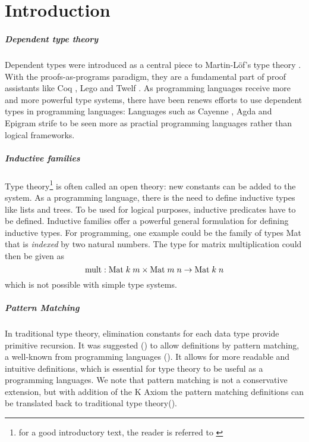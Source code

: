 \chapter{Introduction}

\paragraph*{Dependent type theory}

Dependent types were introduced as a central piece to Martin-L\"of's type theory \cite{mart84}. With the proofs-as-programs paradigm, they are a fundamental part of proof assistants like Coq \cite{coq} , Lego \cite{pollack94theory} and Twelf \cite{pfenning99system}.
As programming languages receive more and more powerful type systems, there have been renews efforts to use dependent types in programming languages: Languages such as Cayenne \cite{augustsson98cayenne}, Agda \cite{norell:thesis} and Epigram \cite{epigram} strife to be seen more as practial programming languages rather than logical frameworks. 

\paragraph*{Inductive families}
Type theory\footnote{for a good introductory text, the reader is referred to \cite{NPS:proml}}
 is often called an open theory: new constants can be added to the system.
As a programming language, there is the need to define inductive types like lists and trees.
To be used for logical purposes, inductive predicates have to be defined. 
Inductive families \cite{dybjer94inductive} offer a powerful general formulation for defining inductive types.  
For programming, one example could be the family of types Mat that is \emph{indexed} by two natural numbers.
The type for matrix multiplication could then be given as 
\[ \mbox{mult} : \mbox{Mat} \; k \; m \times \mbox{Mat} \; m \; n \rightarrow \mbox{Mat} \; k \; n \]
which is not possible with simple type systems.
\paragraph*{Pattern Matching}
In traditional type theory, elimination constants for each data type provide primitive recursion. 
It was suggested (\cite{coquand92pattern}) to allow definitions by pattern matching, a well-known from programming languages (\cite{DBLP:conf/fpca/Augustsson85}).
It allows for more readable and intuitive definitions, which is essential for type theory to be useful as a programming languages. 
We note that pattern matching is not a conservative extension, but with addition of the K Axiom the pattern matching definitions can be translated back to traditional type theory(\cite{hofmann95groupoid,GoguHMcBrCM2006}). 

